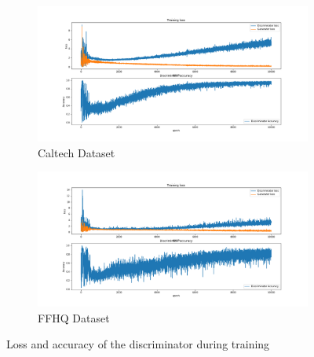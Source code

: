 \begin{figure}[h!]
\centering
\begin{subfigure}[b]{0.45\textwidth}
\includegraphics[width=\textwidth]{fig/dcgan/caltech/loss}
\caption{ Caltech Dataset}
\end{subfigure}
\begin{subfigure}[b]{0.45\textwidth}
\includegraphics[width=\textwidth]{fig/dcgan/ffhq/loss}
\caption{FFHQ  Dataset}
\end{subfigure}
\caption{Loss and accuracy of the discriminator during training}
\end{figure}

